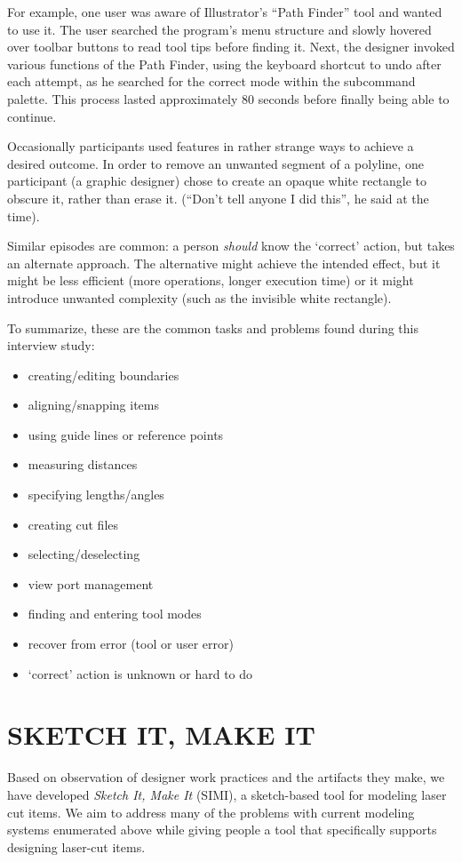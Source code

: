 \documentclass{article}
\begin{document}
For example, one user was aware of Illustrator's ``Path Finder'' tool
and wanted to use it. The user searched the program's menu structure
and slowly hovered over toolbar buttons to read tool tips before
finding it. Next, the designer invoked various functions of the Path
Finder, using the keyboard shortcut to undo after each attempt, as he
searched for the correct mode within the subcommand palette. This
process lasted approximately 80 seconds before finally being able to
continue.

Occasionally participants used features in rather strange ways to
achieve a desired outcome. In order to remove an unwanted segment of a
polyline, one participant (a graphic designer) chose to create an
opaque white rectangle to obscure it, rather than erase it. (``Don't
tell anyone I did this'', he said at the time). 

Similar episodes are common: a person \textit{should} know the
`correct' action, but takes an alternate approach. The alternative
might achieve the intended effect, but it might be less efficient
(more operations, longer execution time) or it might introduce
unwanted complexity (such as the invisible white rectangle).

To summarize, these are the common tasks and problems found during
this interview study:

\begin{itemize}
\item creating/editing boundaries
\item aligning/snapping items
\item using guide lines or reference points
\item measuring distances
\item specifying lengths/angles
\item creating cut files
\item selecting/deselecting
\item view port management
\item finding and entering tool modes
\item recover from error (tool or user error)
\item `correct' action is unknown or hard to do
\end{itemize}

\section{SKETCH IT, MAKE IT}

Based on observation of designer work practices and the artifacts they
make, we have developed \textit{Sketch It, Make It} (SIMI), a
sketch-based tool for modeling laser cut items. We aim to address many
of the problems with current modeling systems enumerated above while
giving people a tool that specifically supports designing laser-cut
items.
\end{document}
